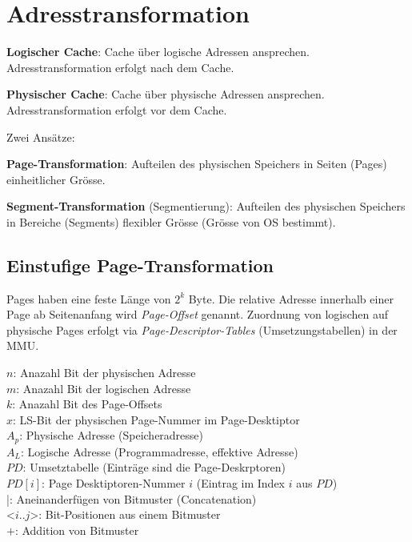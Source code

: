 \section{Adresstransformation}

\textbf{Logischer Cache}: Cache über logische Adressen ansprechen. Adresstransformation erfolgt nach dem Cache.

\textbf{Physischer Cache}: Cache über physische Adressen ansprechen. Adresstransformation erfolgt vor dem Cache.


Zwei Ansätze:

\textbf{Page-Transformation}: Aufteilen des physischen Speichers in Seiten (Pages) einheitlicher Grösse.

\textbf{Segment-Transformation} (Segmentierung): Aufteilen des physischen Speichers in Bereiche (Segments) flexibler Grösse (Grösse von OS bestimmt).

\subsection{Einstufige Page-Transformation}

Pages haben eine feste Länge von $2^k$ Byte.
Die relative Adresse innerhalb einer Page ab Seitenanfang wird \textit{Page-Offset} genannt.
Zuordnung von logischen auf physische Pages erfolgt via \textit{Page-Descriptor-Tables} (Umsetzungstabellen) in der MMU.

{\scriptsize
$n$: Anazahl Bit der physischen Adresse\\
$m$: Anazahl Bit der logischen Adresse\\
$k$: Anazahl Bit des Page-Offsets\\
$x$: LS-Bit der physischen Page-Nummer im Page-Desktiptor\\
$A_p$: Physische Adresse (Speicheradresse)\\
$A_L$: Logische Adresse (Programmadresse, effektive Adresse)\\
$PD$: Umsetztabelle (Einträge sind die Page-Deskrptoren)\\
$PD[i]$: Page Desktiptoren-Nummer $i$ (Eintrag im Index $i$ aus $PD$)\\
|: Aneinanderfügen von Bitmuster (Concatenation)\\
<$i$..$j$>: Bit-Positionen aus einem Bitmuster\\
$+$: Addition von Bitmuster
}



